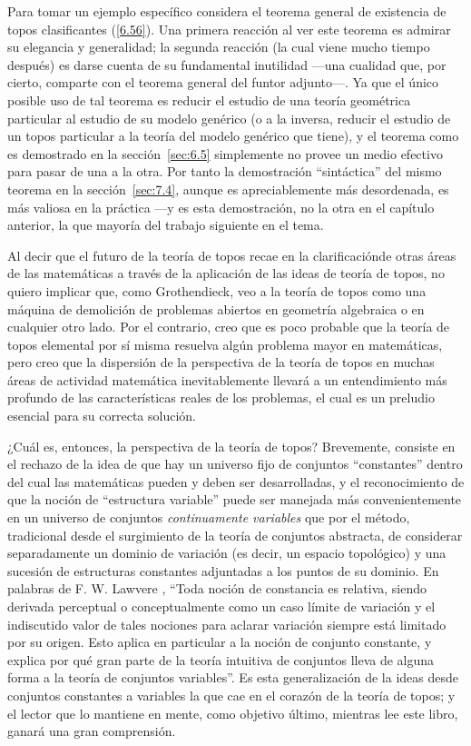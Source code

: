 Para tomar un ejemplo específico considera el teorema general de existencia de
topos clasificantes (\ref{6.56}). Una primera reacción al ver este teorema es
admirar su elegancia y generalidad; la segunda reacción (la cual viene mucho
tiempo después) es darse cuenta de su fundamental inutilidad ---una cualidad
que, por cierto, comparte con el teorema general del funtor adjunto---. Ya que
el único posible uso de tal teorema es reducir el estudio de una teoría
geométrica particular al estudio de su modelo genérico (o a la inversa, reducir
el estudio de un topos particular a la teoría del modelo genérico que tiene), y
el teorema como es demostrado en la sección~\ref{sec:6.5} simplemente no provee
un medio efectivo para pasar de una a la otra. Por tanto la demostración
\enquote{sintáctica} del mismo teorema en la sección~\ref{sec:7.4}, aunque es
apreciablemente más desordenada, es más valiosa en la práctica ---y es esta
demostración, no la otra en el capítulo anterior, la que mayoría del trabajo
siguiente en el tema.

Al decir que el futuro de la teoría de topos recae en la clarificaciónde otras
áreas de las matemáticas a través de la aplicación de las ideas de teoría de
topos, no quiero implicar que, como Grothendieck, veo a la teoría de topos como
una máquina de demolición de problemas abiertos en geometría algebraica o en
cualquier otro lado. Por el contrario, creo que es poco probable que la teoría
de topos elemental por sí misma resuelva algún problema mayor en matemáticas,
pero creo que la dispersión de la perspectiva de la teoría de topos en muchas
áreas de actividad matemática inevitablemente llevará a un entendimiento más
profundo de las características reales de los problemas, el cual es un preludio
esencial para su correcta solución.

¿Cuál es, entonces, la perspectiva de la teoría de topos? Brevemente, consiste
en el rechazo de la idea de que hay un universo fijo de conjuntos
\enquote{constantes} dentro del cual las matemáticas pueden y deben ser
desarrolladas, y el reconocimiento de que la noción de \enquote{estructura
variable} puede ser manejada más convenientemente en un universo de conjuntos
\emph{continuamente variables} que por el método, tradicional desde el
surgimiento de la teoría de conjuntos abstracta, de considerar separadamente un
dominio de variación (es decir, un espacio topológico) y una sucesión de
estructuras constantes adjuntadas a los puntos de su dominio. En palabras de F.
W. Lawvere \pend{[LB]}, \enquote{Toda noción de constancia es relativa, siendo
derivada perceptual o conceptualmente como un caso límite de variación y el
indiscutido valor de tales nociones para aclarar variación siempre está limitado
por su origen. Esto aplica en particular a la noción de conjunto constante, y
explica por qué gran parte de la teoría intuitiva de conjuntos lleva de alguna
forma a la teoría de conjuntos variables}. Es esta generalización de la ideas
desde conjuntos constantes a variables la que cae en el corazón de la teoría de
topos; y el lector que lo mantiene en mente, como objetivo último, mientras lee
este libro, ganará una gran comprensión.

